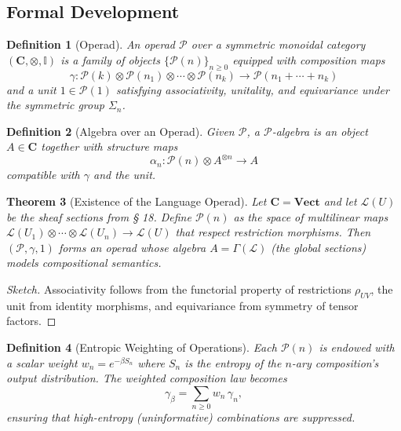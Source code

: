\documentclass[12pt,a4paper,twoside,openright]{book}
\newtheorem{theorem}{Theorem}
\newtheorem{definition}[theorem]{Definition}
\begin{document}
\subsection*{Formal Development}

\begin{definition}[Operad]
An \emph{operad} $\mathcal{P}$ over a symmetric monoidal category $(\mathbf{C},\otimes,\mathbb{I})$
is a family of objects $\{\mathcal{P}(n)\}_{n\ge0}$ equipped with composition maps
\[
\gamma\colon
\mathcal{P}(k)\!\otimes\!
\mathcal{P}(n_1)\!\otimes\!\cdots\!\otimes\!\mathcal{P}(n_k)
 \longrightarrow
\mathcal{P}(n_1+\cdots+n_k)
\]
and a unit $1\!\in\!\mathcal{P}(1)$ satisfying associativity, unitality, and equivariance under the symmetric group $\Sigma_n$.
\end{definition}

\begin{definition}[Algebra over an Operad]
Given $\mathcal{P}$, a \emph{$\mathcal{P}$-algebra} is an object $A\!\in\!\mathbf{C}$ together with structure maps
\[
\alpha_n\colon \mathcal{P}(n)\!\otimes\! A^{\otimes n}\!\to\!A
\]
compatible with $\gamma$ and the unit.
\end{definition}

\begin{theorem}[Existence of the Language Operad]
\label{thm:langoperad}
Let $\mathbf{C}=\mathbf{Vect}$ and let $\mathcal{L}(U)$ be the sheaf sections from § 18.
Define $\mathcal{P}(n)$ as the space of multilinear maps
$\mathcal{L}(U_1)\!\otimes\!\cdots\!\otimes\!\mathcal{L}(U_n)\!\to\!\mathcal{L}(U)$
that respect restriction morphisms.  
Then $(\mathcal{P},\gamma,1)$ forms an operad whose algebra $A=\Gamma(\mathcal{L})$ (the global sections) models compositional semantics.
\end{theorem}

\begin{proof}[Sketch]
Associativity follows from the functorial property of restrictions $\rho_{UV}$,  
the unit from identity morphisms,  
and equivariance from symmetry of tensor factors.
\end{proof}

\begin{definition}[Entropic Weighting of Operations]
Each $\mathcal{P}(n)$ is endowed with a scalar weight
\(
w_n = e^{-\beta S_n}
\)
where $S_n$ is the entropy of the $n$-ary composition’s output distribution.  
The weighted composition law becomes
\[
\gamma_\beta = \sum_{n\ge0} w_n\,\gamma_n,
\]
ensuring that high-entropy (uninformative) combinations are suppressed.
\end{definition}
\end{document}
